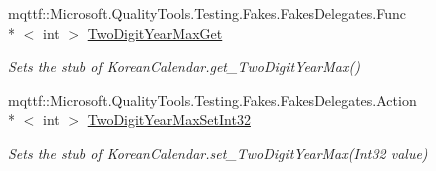 \begin{DoxyCompactItemize}
mqttf\-::\-Microsoft.\-Quality\-Tools.\-Testing.\-Fakes.\-Fakes\-Delegates.\-Func\\*
$<$ int $>$ \hyperlink{class_system_1_1_globalization_1_1_fakes_1_1_stub_korean_calendar_abcc07f502744eb9a4cc68646eaab4561}{Two\-Digit\-Year\-Max\-Get}
\begin{DoxyCompactList}\small\item\em Sets the stub of Korean\-Calendar.\-get\-\_\-\-Two\-Digit\-Year\-Max()\end{DoxyCompactList}\item 
mqttf\-::\-Microsoft.\-Quality\-Tools.\-Testing.\-Fakes.\-Fakes\-Delegates.\-Action\\*
$<$ int $>$ \hyperlink{class_system_1_1_globalization_1_1_fakes_1_1_stub_korean_calendar_ae78a8d6c46fe7b404df05c846ef1750d}{Two\-Digit\-Year\-Max\-Set\-Int32}
\begin{DoxyCompactList}\small\item\em Sets the stub of Korean\-Calendar.\-set\-\_\-\-Two\-Digit\-Year\-Max(\-Int32 value)\end{DoxyCompactList}\end{DoxyCompactItemize}

